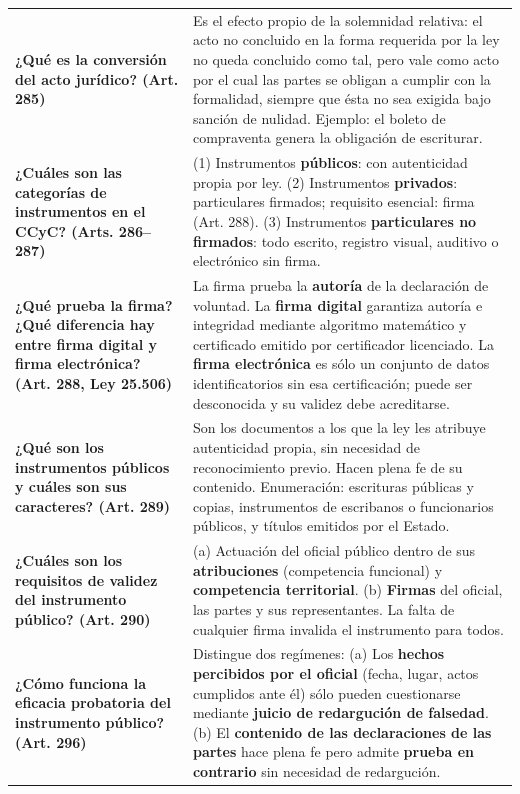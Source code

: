 \documentclass[12pt,oneside]{book}
\begin{document}
\begin{longtable}{@{}     >{\raggedright\arraybackslash}p{}     >{\raggedright\arraybackslash}p{} @{}}
\textbf{¿Qué es la conversión del acto jurídico? (Art. 285)} &
Es el efecto propio de la solemnidad relativa: el acto no concluido en la forma requerida por la ley no queda concluido como tal, pero vale como acto por el cual las partes se obligan a cumplir con la formalidad, siempre que ésta no sea exigida bajo sanción de nulidad. Ejemplo: el boleto de compraventa genera la obligación de escriturar. \\[6pt]

\textbf{¿Cuáles son las categorías de instrumentos en el CCyC? (Arts. 286--287)} &
(1) Instrumentos \textbf{públicos}: con autenticidad propia por ley. (2) Instrumentos \textbf{privados}: particulares firmados; requisito esencial: firma (Art. 288). (3) Instrumentos \textbf{particulares no firmados}: todo escrito, registro visual, auditivo o electrónico sin firma. \\[6pt]

\textbf{¿Qué prueba la firma? ¿Qué diferencia hay entre firma digital y firma electrónica? (Art. 288, Ley 25.506)} &
La firma prueba la \textbf{autoría} de la declaración de voluntad. La \textbf{firma digital} garantiza autoría e integridad mediante algoritmo matemático y certificado emitido por certificador licenciado. La \textbf{firma electrónica} es sólo un conjunto de datos identificatorios sin esa certificación; puede ser desconocida y su validez debe acreditarse. \\[6pt]

\textbf{¿Qué son los instrumentos públicos y cuáles son sus caracteres? (Art. 289)} &
Son los documentos a los que la ley les atribuye autenticidad propia, sin necesidad de reconocimiento previo. Hacen plena fe de su contenido. Enumeración: escrituras públicas y copias, instrumentos de escribanos o funcionarios públicos, y títulos emitidos por el Estado. \\[6pt]

\textbf{¿Cuáles son los requisitos de validez del instrumento público? (Art. 290)} &
(a) Actuación del oficial público dentro de sus \textbf{atribuciones} (competencia funcional) y \textbf{competencia territorial}. (b) \textbf{Firmas} del oficial, las partes y sus representantes. La falta de cualquier firma invalida el instrumento para todos. \\[6pt]

\textbf{¿Cómo funciona la eficacia probatoria del instrumento público? (Art. 296)} &
Distingue dos regímenes: (a) Los \textbf{hechos percibidos por el oficial} (fecha, lugar, actos cumplidos ante él) sólo pueden cuestionarse mediante \textbf{juicio de redargución de falsedad}. (b) El \textbf{contenido de las declaraciones de las partes} hace plena fe pero admite \textbf{prueba en contrario} sin necesidad de redargución. \\[6pt]


\end{longtable}
\end{document}
